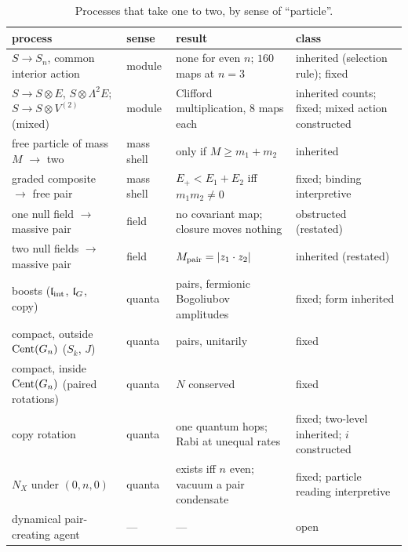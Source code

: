 \begin{table}[!htbp]
\centering
\footnotesize
\begin{tabular}{@{}>{\raggedright\arraybackslash}p{4.0cm}>{\raggedright\arraybackslash}p{1.8cm}>{\raggedright\arraybackslash}p{5.3cm}>{\raggedright\arraybackslash}p{3.6cm}@{}}
\toprule
process & sense & result & class\\
\midrule
$S\to S_n$, common interior action & module & none for even $n$; $160$ maps at $n=3$ & inherited (selection rule); fixed\\
$S\to S\otimes E$, $S\otimes\Lambda^2E$; $S\to S\otimes V^{(2)}$ (mixed) & module & Clifford multiplication, $8$ maps each & inherited counts; fixed; mixed action constructed\\
free particle of mass $M$ $\to$ two & mass shell & only if $M\ge m_1+m_2$ & inherited\\
graded composite $\to$ free pair & mass shell & $E_+<E_1+E_2$ iff $m_1m_2\neq0$ & fixed; binding interpretive\\
one null field $\to$ massive pair & field & no covariant map; closure moves nothing & obstructed (restated)\\
two null fields $\to$ massive pair & field & $M_{\rm pair}=|z_1\cdot z_2|$ & inherited (restated)\\
boosts ($\mathfrak l_{\rm int}$, $\mathfrak l_G$, copy) & quanta & pairs, fermionic Bogoliubov amplitudes & fixed; form inherited\\
compact, outside $\operatorname{Cent}(G_n)$ ($S_k$, $J$) & quanta & pairs, unitarily & fixed\\
compact, inside $\operatorname{Cent}(G_n)$ (paired rotations) & quanta & $N$ conserved & fixed\\
copy rotation & quanta & one quantum hops; Rabi at unequal rates & fixed; two-level inherited; $i$ constructed\\
$N_X$ under $(0,n,0)$ & quanta & exists iff $n$ even; vacuum a pair condensate & fixed; particle reading interpretive\\
dynamical pair-creating agent & --- & --- & open\\
\bottomrule
\end{tabular}
\caption{Processes that take one to two, by sense of ``particle''.}
\label{e2:tab:processes}
\end{table}

